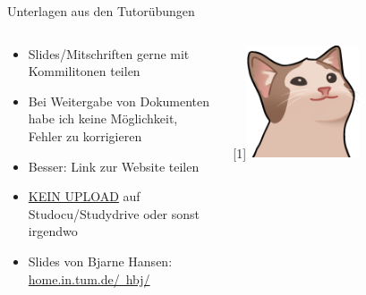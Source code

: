 \documentclass[
  german,            %
  aspectratio=169,    %
]{tumbeamer}
\begin{document}
\begin{frame}[c]{Unterlagen aus den Tutorübungen}{}
	\begin{columns}[c]
		\begin{column}{0.6\textwidth}
			\begin{itemize}
				\item Slides/Mitschriften gerne mit Kommilitonen teilen
				\item Bei Weitergabe von Dokumenten habe ich keine Möglichkeit, Fehler zu korrigieren
				\item Besser: Link zur Website teilen
				\item \underline{KEIN UPLOAD} auf Studocu/Studydrive oder sonst irgendwo
				\item Slides von Bjarne Hansen: \href{https://home.cit.tum.de/~hbj}{home.in.tum.de/\string~hbj/}
			\end{itemize}
		\end{column}
		\begin{column}{0.4\textwidth}
			\begin{center}
				\scalebox{-1}[1]{\includegraphics[width=0.5\textwidth]{w14_popcat.png}}
			\end{center}
		\end{column}
	\end{columns}

\end{frame}
\end{document}
